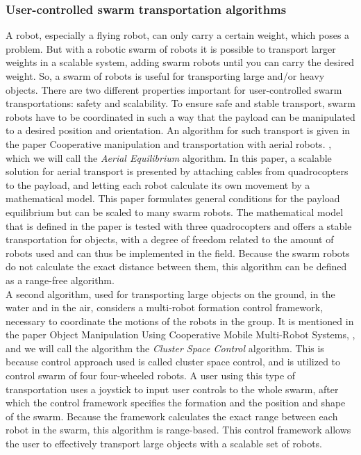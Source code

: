 \subsubsection{User-controlled swarm transportation algorithms}
A robot, especially a flying robot, can only carry a certain weight, which poses a problem. 
But with a robotic swarm of robots it is possible to transport larger weights in a scalable system, adding swarm robots until you can carry the desired weight. 
So, a swarm of robots is useful for transporting large and/or heavy objects. 
There are two different properties important for user-controlled swarm transportations: safety and scalability. 
To ensure safe and stable transport, swarm robots have to be coordinated in such a way that the payload can be manipulated to a desired position and orientation.
An algorithm for such transport is given in the paper Cooperative manipulation and transportation with aerial robots. \cite{Michael2011}, which we will call the \emph{Aerial Equilibrium} algorithm. 
In this paper, a scalable solution for aerial transport is presented by attaching cables from quadrocopters to the payload, and letting each robot calculate its own movement by a mathematical model. 
This paper formulates general conditions for the payload equilibrium but can be scaled to many swarm robots. 
The mathematical model that is defined in the paper is tested with three quadrocopters and offers a stable transportation for objects, with a degree of freedom related to the amount of robots used and can thus be implemented in the field.
Because the swarm robots do not calculate the exact distance between them, this algorithm can be defined as a range-free algorithm. \\

A second algorithm, used for transporting large objects on the ground, in the water and in the air, considers a multi-robot formation control framework, necessary to coordinate the motions of the robots in the group. 
It is mentioned in the paper Object Manipulation Using Cooperative Mobile Multi-Robot Systems, \cite{Mas2012}, and we will call the algorithm the \emph{Cluster Space Control} algorithm.
This is because control approach used is called cluster space control, and is utilized to control swarm of four four-wheeled robots. 
A user using this type of transportation uses a joystick to input user controls to the whole swarm, after which the control framework specifies the formation and the position and shape of the swarm.
Because the framework calculates the exact range between each robot in the swarm, this algorithm is range-based. 
This control framework allows the user to effectively transport large objects with a scalable set of robots. \\

